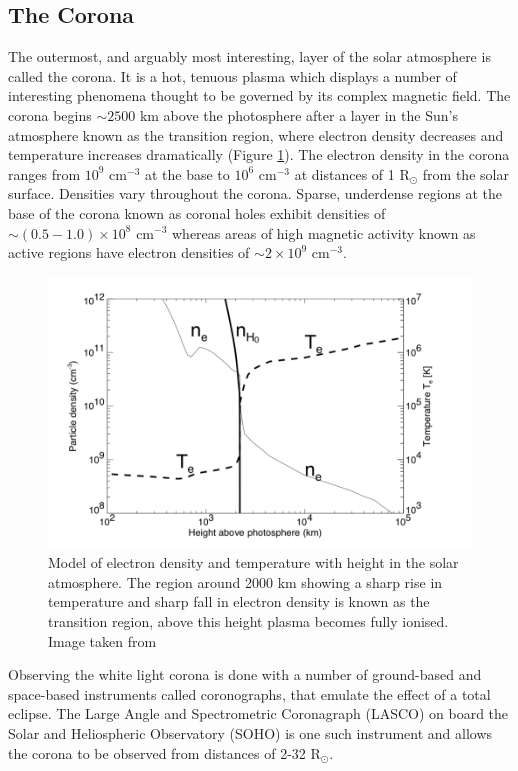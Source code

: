 \subsection{The Corona}
The outermost, and arguably most interesting, layer of the solar atmosphere is called the corona. It is a hot, tenuous plasma which displays a number of interesting phenomena thought to be governed by its complex magnetic field. The corona begins $\sim 2500$ km above the photosphere after a layer in the Sun's atmosphere known as the transition region, where electron density decreases and temperature increases dramatically (Figure \ref{fig:corona_temp}). The electron density in the corona ranges from $10^{9} \mbox{ cm}^{-3}$ at the base to $10^{6} \mbox{ cm}^{-3}$ at distances of 1 R$_{\odot}$ from the solar surface. Densities vary throughout the corona. Sparse, underdense regions at the base of the corona known as coronal holes exhibit densities of $\sim ( 0.5 - 1.0) \times 10^8 \mbox{ cm}^{-3}$ whereas areas of high magnetic activity known as active regions have electron densities of $\sim 2 \times 10^9 \mbox{ cm}^{-3}$.%
\begin{figure}
    \centering
    \includegraphics[width=0.75\columnwidth]{Images/Corona_temp.png}
    \caption[Model of electron density and temperature with height in the solar atmosphere.]{Model of electron density and temperature with height in the solar atmosphere. The region around 2000 km showing a sharp rise in temperature and sharp fall in electron density is known as the transition region, above this height plasma becomes fully ionised. Image taken from \cite{Aschwanden2004}}
    \label{fig:corona_temp}
\end{figure}
Observing the white light corona is done with a number of ground-based and space-based instruments called coronographs, that emulate the effect of a total eclipse. The Large Angle and Spectrometric Coronagraph (LASCO) on board the Solar and Heliospheric Observatory (SOHO) is one such instrument and allows the corona to be observed from distances of 2-32 R$_\odot$. 

